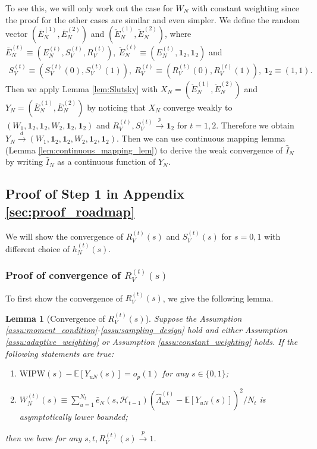 \documentclass[12pt]{article}
\newtheorem{lemma}{Lemma}
\newcommand{\E}{\mathbb E}								%
\newcommand{\convp}{\overset p \rightarrow}             %
\newcommand{\convd}{\overset d \rightarrow}             %
\newcommand{\WIPW}{\mathrm{WIPW}}
\begin{document}
To see this, we will only work out the case for $W_N$ with constant weighting since the proof for the other cases are similar and even simpler. We define the random vector $(\bar E_N^{(1)},\bar E_N^{(2)})$ and $(\check E_N^{(1)},\check E_N^{(2)})$, where $\bar E_N^{(t)}\equiv (E_N^{(t)},S_V^{(t)},R_V^{(t)}),\ \check E_N^{(t)}\equiv (E_N^{(t)},\bm 1_2,\bm 1_2)$ and 
\begin{align*}
	S_V^{(t)}\equiv (S_V^{(t)}(0),S_V^{(t)}(1)),\ R_V^{(t)}\equiv (R_V^{(t)}(0),R_V^{(t)}(1)),\ \bm 1_2\equiv (1,1).
\end{align*}
Then we apply Lemma \ref{lem:Slutsky} with $X_N=(\check E_N^{(1)},\check E_N^{(2)})$ and $Y_N = (\bar E_N^{(1)},\bar E_{N}^{(2)})$ by noticing that $X_N$ converge weakly to $(W_1,\bm 1_2,\bm 1_2,W_2,\bm 1_2,\bm 1_2)$ and $R_V^{(t)},S_V^{(t)}\convp \bm 1_2$ for $t=1,2$. Therefore we obtain $Y_N\convd (W_1,\bm 1_2,\bm 1_2,W_2,\bm 1_2,\bm 1_2)$. Then we can use continuous mapping lemma (Lemma \ref{lem:continuous_mapping_lem}) to derive the weak convergence of $\hat I_N$ by writing $\hat I_N$ as a continuous function of $Y_N$.

	
\subsection{Proof of Step 1 in Appendix \ref{sec:proof_roadmap}}\label{sec:R_V_S_V_proof}

We will show the convergence of $R_V^{(t)}(s)$ and $S_V^{(t)}(s)$ for $s=0,1$ with different choice of $h_N^{(t)}(s)$.

\subsubsection{Proof of convergence of $R_V^{(t)}(s)$}\label{sec:proof_R_V_convergence}

To first show the convergence of $R_V^{(t)}(s)$, we give the following lemma.

\begin{lemma}[Convergence of $R_V^{(t)}(s)$]\label{lem:sufficient_condition_R_V_convergence}
	Suppose the Assumption \ref{assu:moment_condition}-\ref{assu:sampling_design} hold and either Assumption \ref{assu:adaptive_weighting} or Assumption \ref{assu:constant_weighting} holds. If the following statements are true: 
	\begin{enumerate}
		\item $\WIPW(s)-\E[Y_{uN}(s)]=o_p(1)$ for any $s\in \{0,1\}$;
		\item $W_N^{(t)}(s)\equiv\sum_{u=1}^{N_t}\bar e_N(s,\mathcal{H}_{t-1})(\hat{\Lambda}_{uN}^{(t)}-\E[Y_{uN}(s)])^2/N_t$ is asymptotically lower bounded;
	\end{enumerate}
	then we have for any $s,t,R_V^{(t)}(s)\convp 1$.
\end{lemma}
\end{document}
